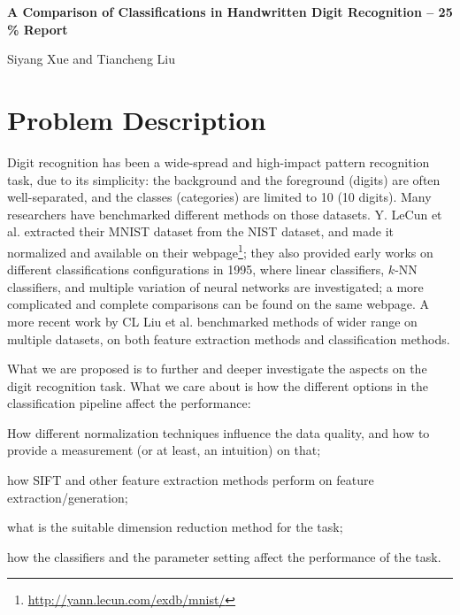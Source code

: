 \documentclass[12pt]{article}
\newenvironment{nscenter}
 {\parskip=0pt\par\nopagebreak\centering}
 {\par\noindent\ignorespacesafterend}
\begin{document}
\thispagestyle{empty}

\bigskip
\bigskip

\begin{nscenter}
\textbf{\Large{A Comparison of Classifications in Handwritten Digit Recognition -- 25 \% Report}}
\end{nscenter}

\bigskip

\begin{nscenter}
{Siyang Xue and Tiancheng Liu}
\end{nscenter}


\section{Problem Description}
\label{sec:problem}


Digit recognition has been a wide-spread and high-impact pattern recognition task, due to its simplicity: the background and the foreground (digits) are often well-separated, and the classes (categories) are limited to 10 (10 digits). Many researchers have benchmarked different methods on those datasets. Y. LeCun et al.\cite{lecun1998gradient} extracted their MNIST dataset from the NIST dataset, and made it normalized and available on their webpage\footnote{\url{http://yann.lecun.com/exdb/mnist/}}; they also provided early works on different classifications configurations in 1995, where linear classifiers, $k$-NN classifiers, and multiple variation of neural networks are investigated; a more complicated and complete comparisons can be found on the same webpage. A more recent work by CL Liu et al.\cite{liu2003handwritten} benchmarked methods of wider range on multiple datasets, on both feature extraction methods and classification methods.

What we are proposed is to further and deeper investigate the aspects on the digit recognition task. What we care about is how the different options in the classification pipeline affect the performance:
\begin{inparaenum} 
\item How different normalization techniques influence the data quality, and how to provide a measurement (or at least, an intuition) on that;
\item how SIFT\cite{lowe2004distinctive} and other feature extraction methods perform on feature extraction/generation; 
\item what is the suitable dimension reduction method for the task;
\item how the classifiers and the parameter setting affect the performance of the task.
\end{inparaenum} 
\end{document}
